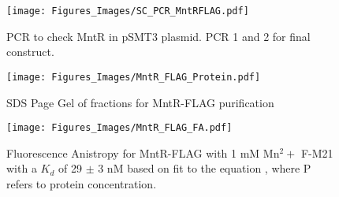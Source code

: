 \documentclass[12pt,twoside]{reedthesis}
\begin{document}
        	\begin{figure}[h!tbp]
        		\centering
        		\texttt{[image: Figures\_Images/SC\_PCR\_MntRFLAG.pdf]}
        		\caption[PCR to Create MntR-FLAG]{PCR to check MntR in pSMT3 plasmid. PCR 1 and 2 for final construct.}
        		\label{PCRMntRFLAG}
        	\end{figure}
     
        	\begin{figure}[h!tbp]
        		\centering
        		\texttt{[image: Figures\_Images/MntR\_FLAG\_Protein.pdf]}
        		\caption[MntR-FLAG Purification]{SDS Page Gel of fractions for MntR-FLAG purification}
        		\label{PurificationMntRFLAG}
        	\end{figure}
     
       	\begin{figure}[h!tbp]
       		\centering
       		\texttt{[image: Figures\_Images/MntR\_FLAG\_FA.pdf]}
       		\caption[Determining DNA Activity of MntR-FLAG by Fluorescence Anistropy]{Fluorescence Anistropy for MntR-FLAG with 1 mM Mn$^2+$ F-M21 with a $K_{d}$ of 29 $\pm$ 3 nM based on fit to the equation \FAstdfit , where P refers to protein concentration.}
       		\label{MntRFLAGFA}
       	\end{figure}
      
\end{document}
